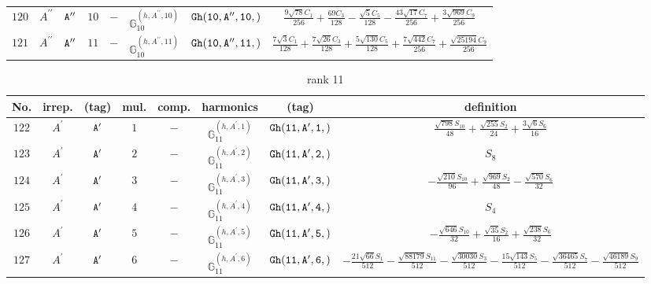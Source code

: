 \documentclass[fleqn,8pt]{jsarticle}
\begin{document}
\begin{table}[ht!]
\begin{center}
\begin{tabular}{cccccccc}
$ 120 $ & $ A^{\prime\prime} $ & $ {\tt A''} $ & $ 10 $ & $ - $ & $ \mathbb{G}_{10}^{(h,A^{\prime\prime},10)} $ & $ {\tt Gh(10,A'',10,)} $ & $ \frac{9 \sqrt{78} C_{1}}{256} + \frac{69 C_{3}}{128} - \frac{\sqrt{5} C_{5}}{128} - \frac{43 \sqrt{17} C_{7}}{256} + \frac{3 \sqrt{969} C_{9}}{256} $ \\
$ 121 $ & $ A^{\prime\prime} $ & $ {\tt A''} $ & $ 11 $ & $ - $ & $ \mathbb{G}_{10}^{(h,A^{\prime\prime},11)} $ & $ {\tt Gh(10,A'',11,)} $ & $ \frac{7 \sqrt{3} C_{1}}{128} + \frac{7 \sqrt{26} C_{3}}{128} + \frac{5 \sqrt{130} C_{5}}{128} + \frac{7 \sqrt{442} C_{7}}{256} + \frac{\sqrt{25194} C_{9}}{256} $ \\
 \hline \hline
\end{tabular}
\end{center}
\end{table}
\begin{table}[ht!]
\begin{center}
\caption{rank 11}
\renewcommand{\arraystretch}{1.3}
\begin{tabular}{cccccccc} \hline \hline
No. & irrep. & (tag) & mul. & comp. & harmonics & (tag) & definition \\ \hline
$ 122 $ & $ A^{\prime} $ & $ {\tt A'} $ & $ 1 $ & $ - $ & $ \mathbb{G}_{11}^{(h,A^{\prime},1)} $ & $ {\tt Gh(11,A',1,)} $ & $ \frac{\sqrt{798} S_{10}}{48} + \frac{\sqrt{255} S_{2}}{24} + \frac{3 \sqrt{6} S_{6}}{16} $ \\
$ 123 $ & $ A^{\prime} $ & $ {\tt A'} $ & $ 2 $ & $ - $ & $ \mathbb{G}_{11}^{(h,A^{\prime},2)} $ & $ {\tt Gh(11,A',2,)} $ & $ S_{8} $ \\
$ 124 $ & $ A^{\prime} $ & $ {\tt A'} $ & $ 3 $ & $ - $ & $ \mathbb{G}_{11}^{(h,A^{\prime},3)} $ & $ {\tt Gh(11,A',3,)} $ & $ - \frac{\sqrt{210} S_{10}}{96} + \frac{\sqrt{969} S_{2}}{48} - \frac{\sqrt{570} S_{6}}{32} $ \\
$ 125 $ & $ A^{\prime} $ & $ {\tt A'} $ & $ 4 $ & $ - $ & $ \mathbb{G}_{11}^{(h,A^{\prime},4)} $ & $ {\tt Gh(11,A',4,)} $ & $ S_{4} $ \\
$ 126 $ & $ A^{\prime} $ & $ {\tt A'} $ & $ 5 $ & $ - $ & $ \mathbb{G}_{11}^{(h,A^{\prime},5)} $ & $ {\tt Gh(11,A',5,)} $ & $ - \frac{\sqrt{646} S_{10}}{32} + \frac{\sqrt{35} S_{2}}{16} + \frac{\sqrt{238} S_{6}}{32} $ \\
$ 127 $ & $ A^{\prime} $ & $ {\tt A'} $ & $ 6 $ & $ - $ & $ \mathbb{G}_{11}^{(h,A^{\prime},6)} $ & $ {\tt Gh(11,A',6,)} $ & $ - \frac{21 \sqrt{66} S_{1}}{512} - \frac{\sqrt{88179} S_{11}}{512} - \frac{\sqrt{30030} S_{3}}{512} - \frac{15 \sqrt{143} S_{5}}{512} - \frac{\sqrt{36465} S_{7}}{512} - \frac{\sqrt{46189} S_{9}}{512} $ \\

\end{tabular}
\end{center}
\end{table}
\end{document}
